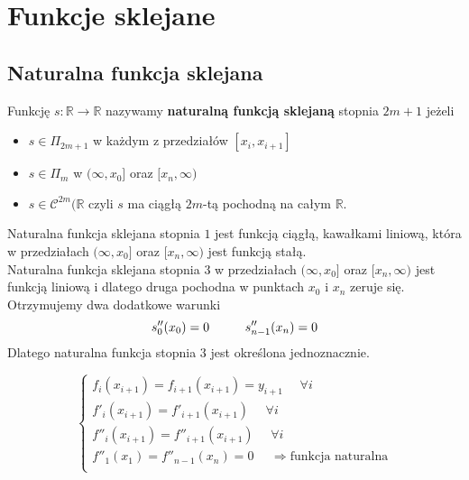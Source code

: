 \documentclass[../mn-notatki.tex]{subfiles}
\begin{document}
\section{Funkcje sklejane}

\subsection{Naturalna funkcja sklejana}
\begin{tcolorbox}
Funkcję $s: \mathbb{R} \rightarrow \mathbb{R}$ nazywamy \textbf{naturalną
funkcją sklejaną} stopnia $2m + 1$ jeżeli
\begin{itemize}
    \item $s \in \Pi_{2m+1}$ w każdym z przedziałów $[x_i, x_{i+1}]$
    \item $s \in \Pi_{m}$ w $(\infty, x_{0}]$ oraz $[x_n, \infty)$
    \item $s \in \mathcal{C}^{2m}(\mathbb{R}$ czyli $s$ ma ciągłą $2m$-tą
    pochodną na całym $\mathbb{R}$.
\end{itemize}
\end{tcolorbox}

\begin{tcolorbox}
Naturalna funkcja sklejana stopnia $1$ jest funkcją ciągłą, kawałkami liniową,
która w przedziałach $(\infty, x_{0}]$ oraz $[x_n, \infty)$ jest funkcją stałą.\\

Naturalna funkcja sklejana stopnia $3$ w przedziałach
$(\infty, x_{0}]$ oraz $[x_n, \infty)$ jest funkcją liniową i dlatego druga
pochodna w punktach $x_0$ i $x_n$ zeruje się.
Otrzymujemy dwa dodatkowe warunki
\[
s''_0 (x_0) = 0 \hspace*{1cm} s''_{n-1}(x_n) = 0
\]
Dlatego naturalna funkcja stopnia $3$ jest określona jednoznacznie.
\end{tcolorbox}

\begin{tcolorbox}
\[
\begin{cases}
f_i(x_{i+1}) = f_{i+1}(x_{i+1}) = y_{i+1} ~~~~~~ \forall i\\
f'_i(x_{i+1}) = f'_{i+1}(x_{i+1})  ~~~~~~ \forall i\\
f''_i(x_{i+1}) = f''_{i+1}(x_{i+1}) ~~~~~~ \forall i\\
f''_1(x_{1}) = f''_{n-1}(x_{n}) = 0 ~~~~~~ \Rightarrow \text{funkcja naturalna}\\
\end{cases}
\]

\end{tcolorbox}
\end{document}
